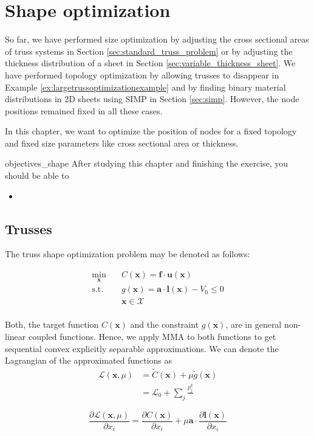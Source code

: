 \chapter{Shape optimization}

So far, we have performed size optimization by adjusting the cross sectional areas of truss systems in Section \ref{sec:standard_truss_problem} or by adjusting the thickness distribution of a sheet in Section \ref{sec:variable_thickness_sheet}. 
We have performed topology optimization by allowing trusses to disappear in Example \ref{ex:largetrussoptimizationexample} and by finding binary material distributions in 2D sheets using SIMP in Section \ref{sec:simp}.
However, the node positions remained fixed in all these cases. 

In this chapter, we want to optimize the position of nodes for a fixed topology and fixed size parameters like cross sectional area or thickness.

\begin{objectives}{}{objectives_shape}
After studying this chapter and finishing the exercise, you should be able to 
\begin{itemize}[label=$\dots$]
    \item 
\end{itemize}
\end{objectives}

\section{Trusses}

The truss shape optimization problem may be denoted as follows:

\begin{equation}
    \begin{aligned}
        \min_{\mathbf{x}} \quad & C(\mathbf{x}) = \mathbf{f} \cdot \mathbf{u}(\mathbf{x})\\
        \textrm{s.t.} \quad & g(\mathbf{x}) = \mathbf{a} \cdot \mathbf{l}(\mathbf{x}) - V_0 \le 0  \\
                            & \mathbf{x} \in \mathcal{X}\\
    \end{aligned}
    \label{eq:shape_optimization}
\end{equation}

Both, the target function $C(\mathbf{x})$ and the constraint $g(\mathbf{x})$, are in general non-linear coupled functions. Hence, we apply MMA to both functions to get sequential convex explicitly separable approximations. We can denote the Lagrangian of the approximated functions as 
\begin{align}
    \mathcal{L}(\mathbf{x}, \mu) &= \tilde{C}(\mathbf{x}) + \mu \tilde{g}(\mathbf{x}) \\
    &= \mathcal{L}_0 + \sum_j \frac{p_j^k}{}
\end{align}





\begin{equation}
    \frac{\partial \mathcal{L} (\mathbf{x}, \mu)}{\partial x_i} 
    = \frac{\partial C (\mathbf{x})}{\partial x_i} + \mu \mathbf{a} \cdot \frac{\partial \mathbf{l}(\mathbf{x})}{\partial x_i}
    \label{eq:lagrange_truss_shape_problem}
\end{equation}